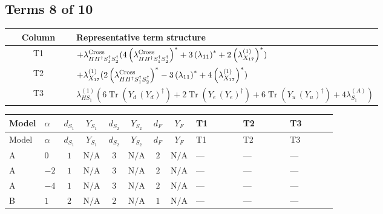 \documentclass[8pt]{article}
\begin{document}
\begin{landscape}
\subsection*{Terms 8 of 10}
\begin{center}
\begin{tabular}{@{}c >{\raggedright\arraybackslash}p{0.82\linewidth}@{}}
\toprule
Column & Representative term structure \\
\midrule
T1 & \(\displaystyle +{\lambda_{H H^\dagger S_1^\dagger S_2^\dagger}^{\rm Cross}} (4 \left({\lambda_{H H^\dagger S_1^\dagger S_2^\dagger}^{\rm Cross}}\right)^{*}+3 \left({\lambda_{11}}\right)^{*}+2 \left({\lambda_{X_{17}}^{(1)}}\right)^{*})\) \\
\midrule
T2 & \(\displaystyle +{\lambda_{X_{17}}^{(1)}} (2 \left({\lambda_{H H^\dagger S_1^\dagger S_2^\dagger}^{\rm Cross}}\right)^{*}-3 \left({\lambda_{11}}\right)^{*}+4 \left({\lambda_{X_{17}}^{(1)}}\right)^{*})\) \\
\midrule
T3 & \(\displaystyle {\lambda_{HS_1}^{(1)}} (6 \operatorname{Tr}\!\left({Y_d}\,\left({Y_d}\right)^{\dagger}\right)+2 \operatorname{Tr}\!\left({Y_e}\,\left({Y_e}\right)^{\dagger}\right)+6 \operatorname{Tr}\!\left({Y_u}\,\left({Y_u}\right)^{\dagger}\right)+4 {\lambda_{S_1}^{(A)}})\) \\
\midrule
\bottomrule
\end{tabular}
\end{center}
\smallskip
\tiny
\begin{longtable}{@{}llcccccc >{\raggedright\arraybackslash}p{0.21\linewidth} >{\raggedright\arraybackslash}p{0.21\linewidth} >{\raggedright\arraybackslash}p{0.21\linewidth}@{}}
\toprule
Model & $\alpha$ & $d_{S_1}$ & $Y_{S_1}$ & $d_{S_2}$ & $Y_{S_2}$ & $d_F$ & $Y_F$ & T1 & T2 & T3 \\
\midrule
\endfirsthead
\toprule
Model & $\alpha$ & $d_{S_1}$ & $Y_{S_1}$ & $d_{S_2}$ & $Y_{S_2}$ & $d_F$ & $Y_F$ & T1 & T2 & T3 \\
\midrule
\endhead
A & $0$ & $1$ & $\text{N/A}$ & $3$ & $\text{N/A}$ & $2$ & $\text{N/A}$ & --- & --- & --- \\
\midrule
A & $-2$ & $1$ & $\text{N/A}$ & $3$ & $\text{N/A}$ & $2$ & $\text{N/A}$ & --- & --- & --- \\
\midrule
A & $-4$ & $1$ & $\text{N/A}$ & $3$ & $\text{N/A}$ & $2$ & $\text{N/A}$ & --- & --- & --- \\
\midrule
B & $1$ & $2$ & $\text{N/A}$ & $2$ & $\text{N/A}$ & $1$ & $\text{N/A}$ & --- & --- & --- \\
\midrule

\end{longtable}
\end{landscape}
\end{document}
